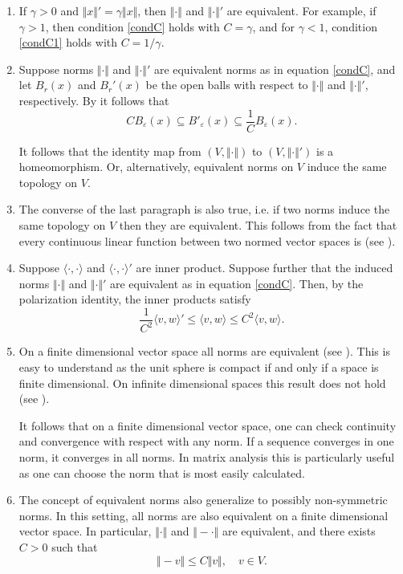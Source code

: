 \documentclass[12pt]{article}
\begin{document}
\begin{enumerate}
\item If $\gamma>0$ and $\Vert x \Vert' = \gamma \Vert x \Vert$, then
$\Vert\cdot \Vert$ and $\Vert\cdot \Vert'$ are equivalent. For example,
if $\gamma>1$, then condition \eqref{condC} holds with $C=\gamma$, and
for $\gamma<1$, condition \eqref{condC1} holds with $C=1/\gamma$.

\item Suppose norms $\Vert \cdot \Vert$ and $\Vert \cdot \Vert'$ are equivalent norms
 as in equation \eqref{condC}, and let $B_r(x)$ and $B_r'(x)$ be the
 open balls with respect to $\Vert \cdot \Vert$ and $\Vert \cdot \Vert'$, respectively.
 By 
 it follows that
 $$
 C B_{\varepsilon}(x) \subseteq B'_\varepsilon(x)\subseteq \frac{1}{C} B_{\varepsilon}(x).
 $$ 

It follows that the identity map from $(V,\Vert \cdot \Vert)$ to $(V,\Vert \cdot \Vert')$
is a homeomorphism. Or, alternatively, equivalent norms on $V$ induce the same
topology on $V$.

\item The converse of the last paragraph is also true, i.e. if two norms induce the same topology on $V$ then they are equivalent. This follows from the fact that every continuous linear function between two normed vector spaces is  (see ).

\item Suppose $\langle\cdot,\cdot\rangle$ and $\langle\cdot,\cdot\rangle'$ are inner product. Suppose further that the induced norms $\Vert\cdot\Vert$ and $\Vert\cdot\Vert'$ are equivalent as in equation \ref{condC}. Then, by the polarization identity, the inner products satisfy 
$$
  \frac{1}{C^2}\langle v,w \rangle'  \le \langle v,w \rangle  \le C^2\langle v,w \rangle.
$$

\item On a finite dimensional vector space all norms are equivalent
(see ).
This is easy to understand as the unit sphere is compact if and only if 
a space is finite dimensional.
On infinite dimensional spaces this result does not hold (see
).

It follows that on a finite dimensional vector space,
one can check continuity and convergence with respect with any norm.
If a sequence converges in one norm, it converges in all norms.
In matrix analysis this is particularly useful as one can choose the norm that
is most easily calculated. 

\item The concept of equivalent norms also generalize to possibly non-symmetric norms. In this setting, all norms are also equivalent on a finite dimensional vector space. In particular, $\Vert\cdot \Vert$ and $\Vert-\cdot\Vert$ are
equivalent, and there exists $C>0$ such that 
$$
  \Vert - v\Vert \le C \Vert v\Vert,\quad v\in V.
$$
\end{enumerate}
\end{document}
